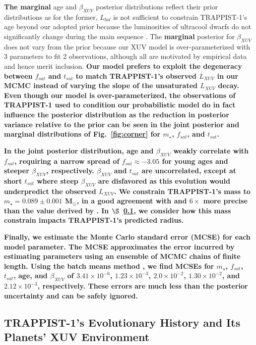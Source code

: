 \documentclass[twocolumn]{aastex62}
\newcommand{\xxx}[1]{{\textbf{#1}}}
\begin{document}
\xxx{The marginal} age and $\beta_{XUV}$ posterior distributions reflect their prior distributions as for the former, $L_{bol}$ is not sufficient to constrain TRAPPIST-1's age beyond our adopted prior because the luminosities of ultracool dwarfs do not significantly change during the main sequence \citep{Baraffe2015}. The \xxx{marginal} posterior for $\beta_{XUV}$ does not vary from the prior because our XUV model is over-parameterized with 3 parameters to fit 2 observations, although all are motivated by empirical data and hence merit inclusion. \xxx{Our model prefers to exploit the degeneracy between $f_{sat}$ and $t_{sat}$ to match TRAPPIST-1's observed $L_{XUV}$ in our MCMC instead of varying the slope of the unsaturated $L_{XUV}$ decay. Even though our model is over-parameterized, the observations of TRAPPIST-1 used to condition our probabilistic model do in fact influence the posterior distribution as the reduction in posterior variance relative to the prior can be seen in the joint posterior and marginal distributions of Fig.~\ref{fig:corner} for $m_{\star}$, $f_{sat}$, and $t_{sat}$.}

\xxx{In the joint posterior distribution, age and $\beta_{XUV}$ weakly correlate with $f_{sat}$, requiring a narrow spread of $f_{sat} \approx -3.05$ for young ages and steeper $\beta_{XUV}$, respectively. $\beta_{XUV}$ and $t_{sat}$ are uncorrelated, except at short $t_{sat}$ where steep $\beta_{XUV}$ are disfavored as this evolution would underpredict the observed $L_{XUV}$. We constrain TRAPPIST-1's mass to $m_{\star} = 0.089 \pm{0.001}$ M$_{\odot}$, in a good agreement with and $6\times$ more precise than the value derived by \citet{vanGrootel2018}. In $\S$~\ref{sec:evol}, we consider how this mass constrain impacts TRAPPIST-1's predicted radius.}

\xxx{Finally, we estimate the Monte Carlo standard error (MCSE) for each model parameter. The MCSE approximates the error incurred by estimating parameters using an ensemble of MCMC chains of finite length. Using the batch means method \citep{Flegal2008,Flegal2010}, we find MCSEs for $m_{\star}$, $f_{sat}$, $t_{sat}$, age, and $\beta_{XUV}$ of $3.41 \times 10^{-6}$, $1.23 \times 10^{-3}$, $2.0 \times 10^{-2}$, $1.30 \times 10^{-2}$, and $2.12 \times 10^{-3}$, respectively. These errors are much less than the posterior uncertainty and can be safely ignored.}

\subsection{TRAPPIST-1's Evolutionary History and Its Planets' XUV Environment} \label{sec:evol}
\end{document}
